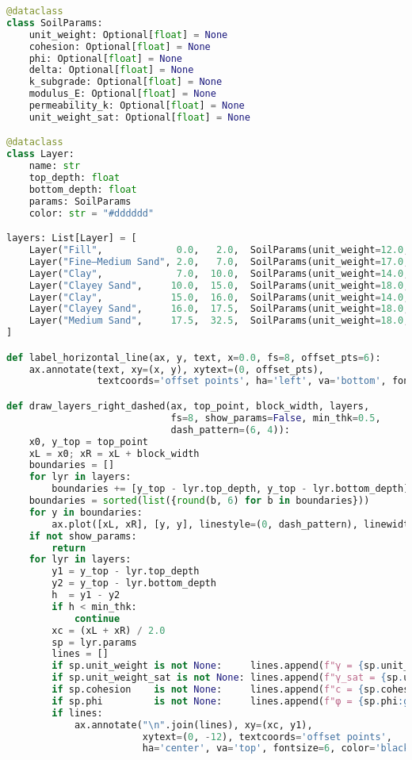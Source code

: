 \begin{lstlisting}[language=Python]
@dataclass
class SoilParams:
    unit_weight: Optional[float] = None
    cohesion: Optional[float] = None
    phi: Optional[float] = None
    delta: Optional[float] = None
    k_subgrade: Optional[float] = None
    modulus_E: Optional[float] = None
    permeability_k: Optional[float] = None
    unit_weight_sat: Optional[float] = None

@dataclass
class Layer:
    name: str
    top_depth: float
    bottom_depth: float
    params: SoilParams
    color: str = "#dddddd"

layers: List[Layer] = [
    Layer("Fill",             0.0,   2.0,  SoilParams(unit_weight=12.0, cohesion=20, phi=15.0, unit_weight_sat=12.0)),
    Layer("Fine–Medium Sand", 2.0,   7.0,  SoilParams(unit_weight=17.0, cohesion=0,  phi=30,   unit_weight_sat=19.0)),
    Layer("Clay",             7.0,  10.0,  SoilParams(unit_weight=14.0, cohesion=25, phi=17.5, unit_weight_sat=14.0)),
    Layer("Clayey Sand",     10.0,  15.0,  SoilParams(unit_weight=18.0, cohesion=0,  phi=25,   unit_weight_sat=20.0)),
    Layer("Clay",            15.0,  16.0,  SoilParams(unit_weight=14.0, cohesion=25, phi=17.5, unit_weight_sat=14.0)),
    Layer("Clayey Sand",     16.0,  17.5,  SoilParams(unit_weight=18.0, cohesion=0,  phi=25,   unit_weight_sat=20.0)),
    Layer("Medium Sand",     17.5,  32.5,  SoilParams(unit_weight=18.0, cohesion=0,  phi=32.5, unit_weight_sat=20.0)),
]

def label_horizontal_line(ax, y, text, x=0.0, fs=8, offset_pts=6):
    ax.annotate(text, xy=(x, y), xytext=(0, offset_pts),
                textcoords='offset points', ha='left', va='bottom', fontsize=fs, color='black')

def draw_layers_right_dashed(ax, top_point, block_width, layers,
                             fs=8, show_params=False, min_thk=0.5,
                             dash_pattern=(6, 4)):
    x0, y_top = top_point
    xL = x0; xR = xL + block_width
    boundaries = []
    for lyr in layers:
        boundaries += [y_top - lyr.top_depth, y_top - lyr.bottom_depth]
    boundaries = sorted(list({round(b, 6) for b in boundaries}))
    for y in boundaries:
        ax.plot([xL, xR], [y, y], linestyle=(0, dash_pattern), linewidth=1.2, color="black")
    if not show_params:
        return
    for lyr in layers:
        y1 = y_top - lyr.top_depth
        y2 = y_top - lyr.bottom_depth
        h  = y1 - y2
        if h < min_thk: 
            continue
        xc = (xL + xR) / 2.0
        sp = lyr.params
        lines = []
        if sp.unit_weight is not None:     lines.append(f"γ = {sp.unit_weight:g} kN/m³")
        if sp.unit_weight_sat is not None: lines.append(f"γ_sat = {sp.unit_weight_sat:g} kN/m³")
        if sp.cohesion    is not None:     lines.append(f"c = {sp.cohesion:g} kPa")
        if sp.phi         is not None:     lines.append(f"φ = {sp.phi:g}°")
        if lines:
            ax.annotate("\n".join(lines), xy=(xc, y1),
                        xytext=(0, -12), textcoords='offset points',
                        ha='center', va='top', fontsize=6, color='black')


\end{lstlisting}
